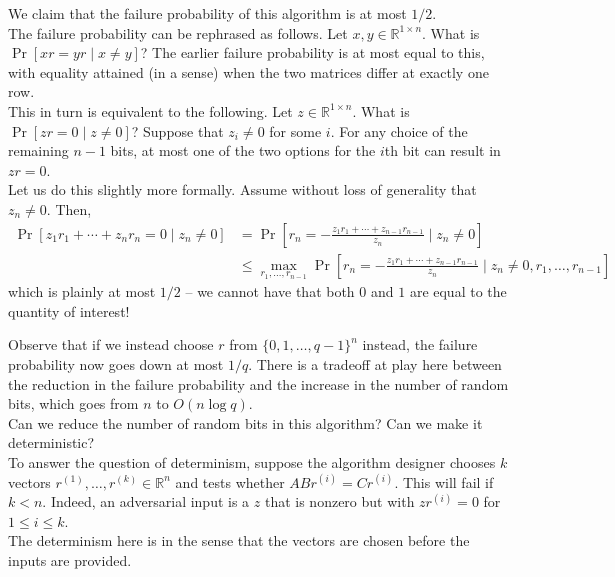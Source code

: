 \documentclass{article}
\begin{document}
We claim that the failure probability of this algorithm is at most $1/2$.\\
The failure probability can be rephrased as follows. Let $x,y \in \mathbb{R}^{1 \times n}$. What is $\Pr[xr = yr \mid x \ne y]$? The earlier failure probability is at most equal to this, with equality attained (in a sense) when the two matrices differ at exactly one row. \\
This in turn is equivalent to the following. Let $z \in \mathbb{R}^{1 \times n}$. What is $\Pr[zr = 0 \mid z \ne 0]$? Suppose that $z_i \ne 0$ for some $i$. For any choice of the remaining $n-1$ bits, at most one of the two options for the $i$th bit can result in $zr = 0$.\\
Let us do this slightly more formally. Assume without loss of generality that $z_n \ne 0$. Then,
\begin{align*}
   \Pr\left[z_1r_1 + \cdots + z_nr_n = 0 \mid z_n \ne 0\right] &= \Pr\left[r_n = -\frac{z_1r_1 + \cdots + z_{n-1}r_{n-1}}{z_n} \mid z_n \ne 0\right] \\
      &\le \max_{r_1,\ldots,r_{n-1}} \Pr\left[ r_n = -\frac{z_1r_1 + \cdots + z_{n-1}r_{n-1}}{z_n} \mid z_n \ne 0, r_1,\ldots,r_{n-1} \right]
\end{align*}
which is plainly at most $1/2$ -- we cannot have that both $0$ and $1$ are equal to the quantity of interest!

  Observe that if we instead choose $r$ from $\{0,1,\ldots,q-1\}^n$ instead, the failure probability now goes down at most $1/q$. There is a tradeoff at play here between the reduction in the failure probability and the increase in the number of random bits, which goes from $n$ to $O(n \log q)$. \\


Can we reduce the number of random bits in this algorithm? Can we make it deterministic?\\

To answer the question of determinism, suppose the algorithm designer chooses $k$ vectors $r^{(1)},\ldots,r^{(k)} \in \mathbb{R}^n$ and tests whether $ABr^{(i)} = Cr^{(i)}$. This will fail if $k < n$. Indeed, an adversarial input is a $z$ that is nonzero but with $zr^{(i)} = 0$ for $1 \le i \le k$.\\
The determinism here is in the sense that the vectors are chosen before the inputs are provided.\\
\end{document}
